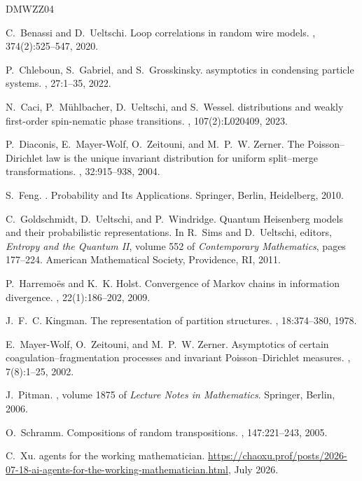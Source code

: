 \documentclass[a4paper,11pt]{article}
\numberwithin{equation}{section}
\begin{document}
\begin{thebibliography}{DMWZZ04}

C.~Benassi and D.~Ueltschi.
\newblock Loop correlations in random wire models.
, 374(2):525--547, 2020.

P.~Chleboun, S.~Gabriel, and S.~Grosskinsky.
 asymptotics in condensing particle systems.
, 27:1--35, 2022.

N.~Caci, P.~M{\"u}hlbacher, D.~Ueltschi, and S.~Wessel.
 distributions and weakly first-order spin-nematic phase transitions.
, 107(2):L020409, 2023.

P.~Diaconis, E.~Mayer-Wolf, O.~Zeitouni, and M.~P.~W. Zerner.
\newblock The {Poisson--Dirichlet} law is the unique invariant distribution for uniform split--merge transformations.
, 32:915--938, 2004.

S.~Feng.
.
\newblock Probability and Its Applications. Springer, Berlin, Heidelberg, 2010.

C.~Goldschmidt, D.~Ueltschi, and P.~Windridge.
\newblock Quantum {Heisenberg} models and their probabilistic representations.
\newblock In R.~Sims and D.~Ueltschi, editors, {\em Entropy and the Quantum II}, volume 552 of {\em Contemporary Mathematics}, pages 177--224. American Mathematical Society, Providence, RI, 2011.

P.~Harremo{\"e}s and K.~K. Holst.
\newblock Convergence of Markov chains in information divergence.
, 22(1):186--202, 2009.

J.~F.~C. Kingman.
\newblock The representation of partition structures.
, 18:374--380, 1978.

E.~Mayer-Wolf, O.~Zeitouni, and M.~P.~W. Zerner.
\newblock Asymptotics of certain coagulation--fragmentation processes and invariant {Poisson--Dirichlet} measures.
, 7(8):1--25, 2002.

J.~Pitman.
, volume 1875 of {\em Lecture Notes in Mathematics}.
\newblock Springer, Berlin, 2006.

O.~Schramm.
\newblock Compositions of random transpositions.
, 147:221--243, 2005.

C.~Xu.
 agents for the working mathematician.
\newblock \url{https://chaoxu.prof/posts/2026-07-18-ai-agents-for-the-working-mathematician.html}, July 2026.

\end{thebibliography}




\newpage
\end{document}
